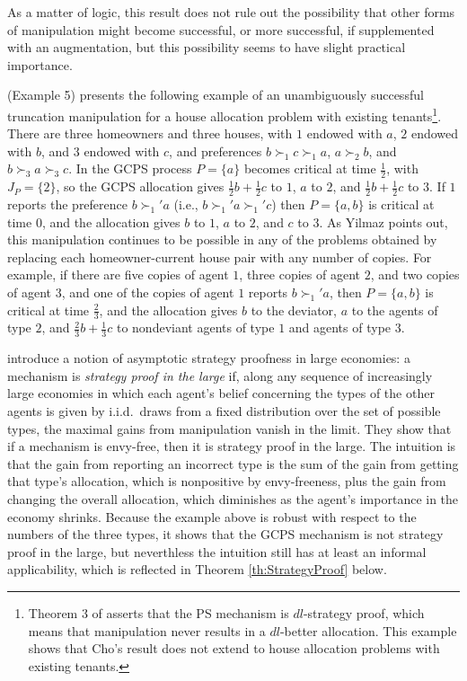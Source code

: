 \documentclass[12pt, A4paper]{article}
\theoremstyle{definition}
\begin{document}
\noindent As a matter of logic, this result does not rule out the possibility that other forms of manipulation might become successful, or more successful, if supplemented with an augmentation, but this possibility seems to have slight practical importance.

\cite{yilmaz10geb} (Example 5) presents the following example of an unambiguously successful truncation manipulation for a house allocation problem with existing tenants\footnote{Theorem 3 of \citet{cho18scw} asserts that the PS mechanism is $dl$-strategy proof, which means that manipulation never results in a $dl$-better allocation.  This example shows that Cho's result does not extend to house allocation problems with existing tenants.}.  There are three homeowners and three houses, with  $1$ endowed with $a$, $2$ endowed with $b$, and $3$ endowed with $c$, and preferences $b \succ_1 c \succ_1 a$, $a \succ_2 b$, and $b \succ_3 a \succ_3 c$.  In the GCPS process $P = \{a\}$ becomes critical at time $\tfrac12$, with $J_P = \{2\}$, so the GCPS allocation gives $\tfrac12 b + \tfrac12 c$ to $1$,  $a$ to $2$, and  $\tfrac12 b + \tfrac12 c$ to $3$.  If $1$ reports the preference  $b \succ_1' a$  (i.e., $b \succ_1' a \succ_1' c$) then $P = \{a,b\}$ is critical at time $0$, and the allocation gives $b$ to $1$, $a$ to $2$, and $c$ to $3$.  As Yilmaz points out, this manipulation continues to be possible in any of the problems obtained by replacing each homeowner-current house pair with any number of copies.  For example, if there are five copies of agent $1$, three copies of agent $2$, and two copies of agent $3$, and one of the copies of agent $1$ reports  $b \succ_1' a$, then $P = \{a,b\}$ is critical at time $\tfrac23$, and the allocation gives $b$ to the deviator, $a$ to the agents of type $2$, and $\tfrac23 b + \tfrac13 c$ to nondeviant agents of type $1$ and agents of type $3$.

\cite{ab19res} introduce a notion of asymptotic strategy proofness in large economies: a mechanism is \emph{strategy proof in the large} if, along any sequence of increasingly large economies in which each agent's belief concerning the types of the other agents is given by i.i.d.~draws from a fixed distribution over the set of possible types, the maximal gains from manipulation vanish in the limit.  They show that if a mechanism is envy-free, then it is strategy proof in the large.  The intuition is that the gain from reporting an incorrect type is the sum of the gain from getting that type's allocation, which is nonpositive by envy-freeness, plus the gain from changing the overall allocation, which diminishes as the agent's importance in the economy shrinks. 
Because the example above is robust with respect to the numbers of the three types, it shows that the GCPS mechanism is not strategy proof in the large, but neverthless the intuition still has at least an informal applicability, which is reflected in Theorem \ref{th:StrategyProof} below.
\end{document}
